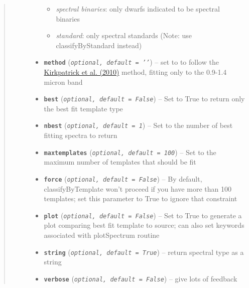 \documentclass[letterpaper,10pt,english]{sphinxmanual}
\begin{document}
\begin{fulllineitems}
\begin{quote}
\begin{description}
\begin{itemize}
\begin{itemize}
\item {} 
\emph{spectral binaries}: only dwarfs indicated to be spectral binaries

\item {} 
\emph{standard}: only spectral standards (Note: use classifyByStandard instead)

\end{itemize}


\item {} 
\textbf{\texttt{method}} (\emph{\texttt{optional, default = '{'}}}) -- 
set to  to follow the \href{http://adsabs.harvard.edu/abs/2010ApJS..190..100K}{Kirkpatrick et al. (2010)} method, fitting only to the 0.9-1.4 micron band


\item {} 
\textbf{\texttt{best}} (\emph{\texttt{optional, default = False}}) -- Set to True to return only the best fit template type

\item {} 
\textbf{\texttt{nbest}} (\emph{\texttt{optional, default = 1}}) -- Set to the number of best fitting spectra to return

\item {} 
\textbf{\texttt{maxtemplates}} (\emph{\texttt{optional, default = 100}}) -- Set to the maximum number of templates that should be fit

\item {} 
\textbf{\texttt{force}} (\emph{\texttt{optional, default = False}}) -- By default, classifyByTemplate won't proceed if you have more than 100 templates; set this parameter to True to ignore that constraint

\item {} 
\textbf{\texttt{plot}} (\emph{\texttt{optional, default = False}}) -- Set to True to generate a plot comparing best fit template to source; can also set keywords associated with plotSpectrum routine

\item {} 
\textbf{\texttt{string}} (\emph{\texttt{optional, default = True}}) -- return spectral type as a string

\item {} 
\textbf{\texttt{verbose}} (\emph{\texttt{optional, default = False}}) -- give lots of feedback

\end{itemize}

\end{description}\end{quote}


\end{fulllineitems}
\end{document}
